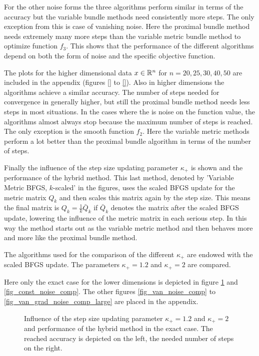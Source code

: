 For the other noise forms the three algorithms perform similar in terms of the accuracy but the variable bundle methods need consistently more steps.
The only exception from this is case of vanishing noise. Here the proximal bundle method needs extremely many more steps  than the variable metric bundle method to optimize function \(f_3\). This shows that the performance of the different algorithms depend on both the form of noise and the specific objective function.

The plots for the higher dimensional data \(x \in \mathbb{R}^n\) for \(n = 20,25,30,40,50\) are included in the appendix (figures \ref{} to \ref{}).
Also in higher dimensions the algorithms achieve a similar accuracy. The number of steps needed for convergence in generally higher, but still the proximal bundle method needs less steps in most situations.
In the cases where the is noise on the function value, the algorithms almost always stop because the maximum number of steps is reached. The only exception is the smooth function \(f_2\). Here the variable  metric methods perform a lot better  than the proximal bundle algorithm in terms of the number  of steps.

Finally the influence of the step size updating parameter \(\kappa_+\) is shown and the performance of the hybrid method.
This last method, denoted by 'Variable Metric BFGS, \(k\)-scaled' in the figures, uses the scaled BFGS update for the metric matrix \(Q_k\) and then scales this matrix again by the step size. This means the final matrix is \(Q_k = \frac{1}{k}\bar{Q}_k\) if \(\bar{Q}_k\) denotes the matrix after the scaled BFGS update, lowering the influence of the metric matrix in each serious step.
In this way the method starts out as the variable metric method and then behaves more and more like the proximal bundle method.

The algorithms used for the comparison of the different \(\kappa_+\) are endowed with the scaled BFGS update. The parameters \(\kappa_+ = 1.2\) and \(\kappa_+ = 2\) are compared.

Here only the exact case for the lower dimensions is depicted in figure \ref{fig_no_noise_comp} and \ref{fig_const_noise_comp}. The other figures \ref{fig_van_noise_comp} to \ref{fig_van_grad_noise_comp_large} are placed in the appendix.

\begin{figure}[ht]%
	\begin{subfigure}{0.49\textwidth}
	\end{subfigure}
	\begin{subfigure}{0.49\textwidth}
	\end{subfigure}
	\caption{Influence of the step size updating parameter \(\kappa_+ = 1.2\) and \(\kappa_+ =2 \) and performance of the hybrid method in the exact case. The reached accuracy is depicted on the left, the needed number of steps on the right.}
	\label{fig_no_noise_comp}
\end{figure}

